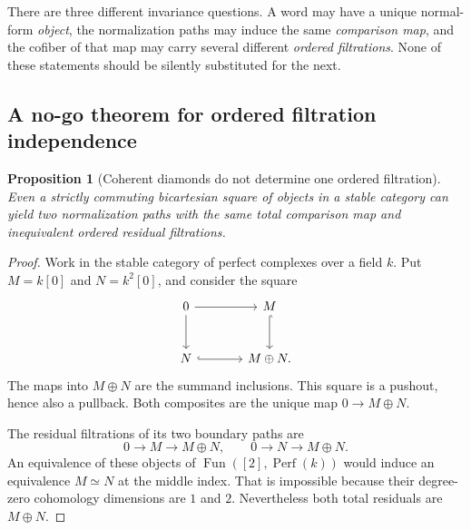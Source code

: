 \documentclass[11pt]{article}
\newtheorem{proposition}[theorem]{Proposition}
\theoremstyle{definition}
\theoremstyle{remark}
\begin{document}
There are three different invariance questions. A word may have a unique normal-form \emph{object}, the normalization paths may induce the same \emph{comparison map}, and the cofiber of that map may carry several different \emph{ordered filtrations}. None of these statements should be silently substituted for the next.

\subsection{A no-go theorem for ordered filtration independence}

\begin{proposition}[Coherent diamonds do not determine one ordered filtration]\label{prop:filtration-no-go}
Even a strictly commuting bicartesian square of objects in a stable category can yield two normalization paths with the same total comparison map and inequivalent ordered residual filtrations.
\end{proposition}

\begin{proof}
Work in the stable category of perfect complexes over a field $k$. Put $M=k[0]$ and $N=k^2[0]$, and consider the square
\[
\begin{tikzcd}[column sep=large,row sep=large]
0 \arrow[r] \arrow[d] & M \arrow[d,hook] \\
N \arrow[r,hook] & M\oplus N.
\end{tikzcd}
\]
The maps into $M\oplus N$ are the summand inclusions. This square is a pushout, hence also a pullback. Both composites are the unique map $0\to M\oplus N$.

The residual filtrations of its two boundary paths are
\[
0\longrightarrow M\longrightarrow M\oplus N,
\qquad
0\longrightarrow N\longrightarrow M\oplus N.
\]
An equivalence of these objects of $\operatorname{Fun}([2],\operatorname{Perf}(k))$ would induce an equivalence $M\simeq N$ at the middle index. That is impossible because their degree-zero cohomology dimensions are $1$ and $2$. Nevertheless both total residuals are $M\oplus N$.
\end{proof}
\end{document}
